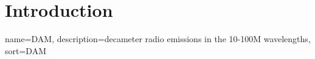 \documentclass[runningheads,a4paper]{llncs}
\begin{document}









%
\renewcommand*{\glsclearpage}{}
\printglossaries
%
\newpage
\tableofcontents
\newpage
\listoftables
{}
%
\newpage
\chapter*{Introduction}

%
{
  name={DAM},
  description={decameter radio emissions in the 10-100M wavelengths},
  sort=DAM
}
%
\end{document}
